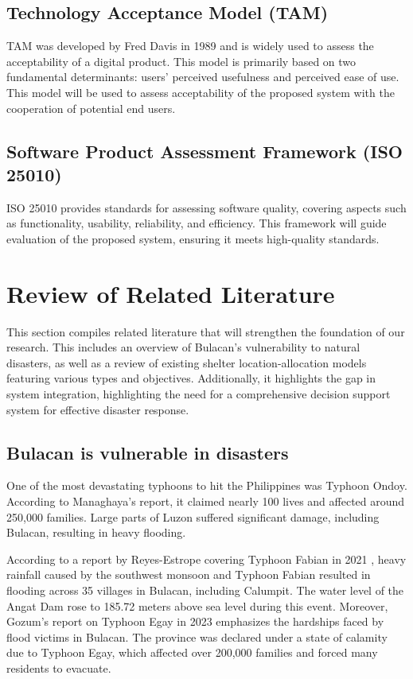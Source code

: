  \subsection{Technology Acceptance Model (TAM)}
 	TAM was developed by Fred Davis in 1989 and is widely used to assess the acceptability of a digital product. This model is primarily based on two fundamental determinants: users' perceived usefulness and perceived ease of use. This model will be used to assess acceptability of the proposed system with the cooperation of potential end users.

\subsection{Software Product Assessment Framework (ISO 25010)}
	ISO 25010 provides standards for assessing software quality, covering aspects such as functionality, usability, reliability, and efficiency. This framework will guide evaluation of the proposed  system, ensuring it meets high-quality standards.

\section{Review of Related Literature}
	This section compiles related literature that will strengthen the foundation of our research. This includes an overview of Bulacan's vulnerability to natural disasters, as well as a review of existing shelter location-allocation models featuring various types and objectives. Additionally, it highlights the gap in system integration, highlighting the need for a comprehensive decision support system for effective disaster response.
	
\subsection{Bulacan is vulnerable in disasters}
	One of the most devastating typhoons to hit the Philippines was Typhoon Ondoy. According to Managhaya's report, it claimed nearly 100 lives and affected around 250,000 families. Large parts of Luzon suffered significant damage, including Bulacan, resulting in heavy flooding. \parencite{James2009}

	According to a report by Reyes-Estrope covering Typhoon Fabian in 2021 \parencite{Carmela2021}, heavy rainfall caused by the southwest monsoon and Typhoon Fabian resulted in flooding across 35 villages in Bulacan, including Calumpit. The water level of the Angat Dam rose to 185.72 meters above sea level during this event. Moreover, Gozum's report on Typhoon Egay in 2023 \parencite{Iya2023} emphasizes the hardships faced by flood victims in Bulacan. The province was declared under a state of calamity due to Typhoon Egay, which affected over 200,000 families and forced many residents to evacuate.

